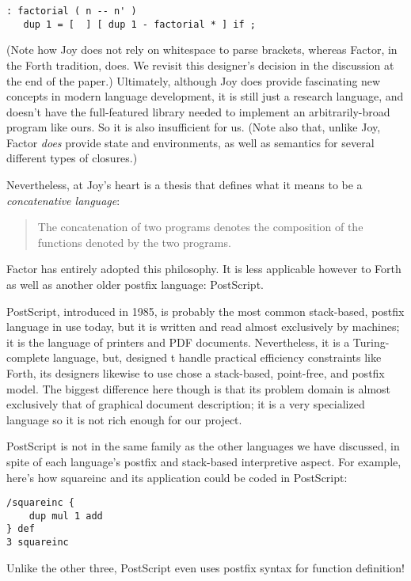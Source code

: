 \documentclass{sig-alternate}
\begin{document}
\begin{verbatim}
: factorial ( n -- n' ) 
   dup 1 = [  ] [ dup 1 - factorial * ] if ;
\end{verbatim}

(Note how Joy does not rely on whitespace to parse brackets, whereas Factor, in the Forth tradition, does. We revisit this designer's decision in the discussion at the end of the paper.)
Ultimately, although Joy does provide fascinating new concepts in modern language development, it is still just a research language, and doesn't have the full-featured library needed to implement an arbitrarily-broad program like ours. So it is also insufficient for us. (Note also that, unlike Joy, Factor \textit{does} provide state and environments, as well as semantics for several different types of closures.)

Nevertheless, at Joy's heart is a thesis that defines what it means to be a \textit{concatenative language}:
 \begin{quote}
 The concatenation of two programs denotes the composition of the functions denoted by the two programs. \cite{JoyForth}
 \end{quote}
 Factor has entirely adopted this philosophy. It is less applicable however to Forth as well as another older postfix language: PostScript.\cite{Concatenative}

PostScript\cite{PostScriptRef}, introduced in 1985, is probably the most common stack-based, postfix language in use today, but it is written and read almost exclusively by machines; it is the language of printers and PDF documents. Nevertheless, it is a Turing-complete language, but, designed t handle practical efficiency constraints like Forth, its designers likewise to use chose a stack-based, point-free, and postfix model. The biggest difference here though is that its problem domain is almost exclusively that of graphical document description; it is a very specialized language so it is not rich enough for our project. 

PostScript is not in the same family as the other languages we have discussed, in spite of each language's postfix and stack-based interpretive aspect. For example, here's how squareinc and its application could be coded in PostScript:
\begin{verbatim}
/squareinc {
    dup mul 1 add
} def
3 squareinc
\end{verbatim}


Unlike the other three, PostScript even uses postfix syntax for function definition!
\end{document}
